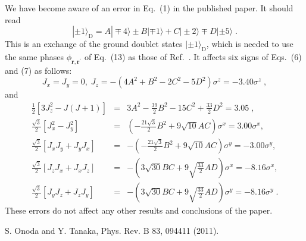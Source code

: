 \documentclass[%
 reprint,
 amsmath,amssymb,
 aps,
]{revtex4-2}
\begin{document}
\begin{widetext}
%

We have become aware of an error in Eq.~(1) in the published paper. 
It should read 
%
\begin{equation}
| \pm 1 \rangle_{\text{D}} 
= A | \mp 4 \rangle \pm B | \mp 1 \rangle + C | \pm 2 \rangle \mp D | \pm 5 \rangle \nonumber \; .
\label{G_doublet}
\end{equation}
%
This is an exchange of the ground doublet states $| \pm 1 \rangle_{\text{D}}$, 
which is needed to use the same phases $\phi_{\bm{r},\bm{r}^{\prime}}$ of Eq.~(13) as 
those of Ref.~\cite{Onoda2011}. 
It affects six signs of Eqs.~(6) and (7) as follows: 
%
\begin{equation}
J_x = J_y = 0 , \; J_z = - (4A^2+B^2-2C^2-5D^2) \sigma^z = - 3.40 \sigma^z \nonumber \; ,
\label{mag}
\end{equation}
%
and
%
\begin{eqnarray}
\tfrac{1}{2}[ 3 J_z^2 -J(J+1)] &=& 
3A^2 - \tfrac{39}{2} B^2 - 15 C^2 + \tfrac{33}{2} D^2 = 3.05 \; ,\nonumber\\
%
\tfrac{\sqrt{3}}{2}[ J_x^2 - J_y^2] &=& 
\left( -\tfrac{21 \sqrt{3}}{2} B^2 + 9 \sqrt{10} AC \right) \sigma^x =  3.00 \sigma^x ,\nonumber\\
\tfrac{\sqrt{3}}{2}[ J_x J_y + J_y J_x ] &=& 
- \left( -\tfrac{21 \sqrt{3}}{2} B^2 + 9 \sqrt{10} AC \right) \sigma^y =  - 3.00 \sigma^y ,\nonumber\\
\tfrac{\sqrt{3}}{2}[ J_z J_x + J_x J_z ] &=& 
- \left( 3 \sqrt{30} BC + 9 \sqrt{\tfrac{33}{2}} AD \right) \sigma^x =  -8.16 \sigma^x ,\nonumber\\
\tfrac{\sqrt{3}}{2}[ J_y J_z + J_z J_y ] &=& 
- \left( 3 \sqrt{30} BC + 9 \sqrt{\tfrac{33}{2}} AD \right) \sigma^y =  - 8.16 \sigma^y \nonumber \; .
\label{quad2}
\end{eqnarray}
%
These errors do not affect any other results and conclusions of the paper.

%

\begin{thebibliography}{9}
S. Onoda and Y. Tanaka, Phys. Rev. B 83, 094411 (2011).

\end{thebibliography}

\end{widetext}

%
\end{document}
